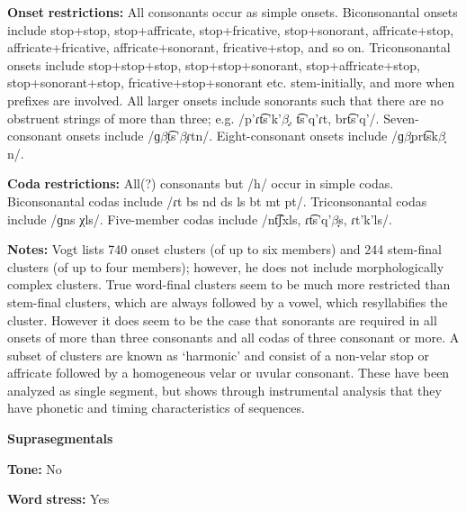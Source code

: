 \begin{styleBody}
\textbf{Onset} \textbf{restrictions:} All consonants occur as simple onsets. Biconsonantal onsets include stop+stop, stop+affricate, stop+fricative, stop+sonorant, affricate+stop, affricate+fricative, affricate+sonorant, fricative+stop, and so on. Triconsonantal onsets include stop+stop+stop, stop+stop+sonorant, stop+affricate+stop, stop+sonorant+stop, fricative+stop+sonorant etc. stem-initially, and more when prefixes are involved. All larger onsets include sonorants such that there are no obstruent strings of more than three; e.g. /p’ɾt͡s’k'$\beta ̞$, t͡s’q’ɾt, brt͡s'q{}'/. Seven-consonant onsets include /ɡ$\beta ̞$t͡s’$\beta ̞ɾ$tn/. Eight-consonant onsets include /ɡ$\beta ̞$prt͡sk$\beta ̞$n/.
\end{styleBody}

\begin{styleBody}
\textbf{Coda} \textbf{restrictions:} All(?) consonants but /h/ occur in simple codas. Biconsonantal codas include /ɾt bs nd ds ls bt mt pt/. Triconsonantal codas include /ɡns χls/. Five-member codas include /nt͡ʃxls, ɾt͡s’q’$\beta ̞$s, ɾt'k'ls/.
\end{styleBody}

\begin{styleBody}
\textbf{Notes:} Vogt lists 740 onset clusters (of up to six members) and 244 stem-final clusters (of up to four members); however, he does not include morphologically complex clusters. True word-final clusters seem to be much more restricted than stem-final clusters, which are always followed by a vowel, which resyllabifies the cluster. However it does seem to be the case that sonorants are required in all onsets of more than three consonants and all codas of three consonant or more. A subset of clusters are known as ‘harmonic’ and consist of a non-velar stop or affricate followed by a homogeneous velar or uvular consonant. These have been analyzed as single segment, but \citet{Chitoran1998} shows through instrumental analysis that they have phonetic and timing characteristics of sequences.
\end{styleBody}

\begin{styleBody}
\textbf{Suprasegmentals}
\end{styleBody}

\begin{styleBody}
\textbf{Tone:} No
\end{styleBody}

\begin{styleBody}
\textbf{Word} \textbf{stress:} Yes
\end{styleBody}

